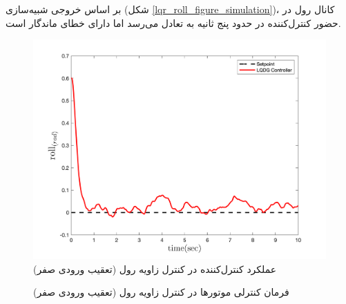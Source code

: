 بر اساس خروجی شبیه‌سازی (شکل
\ref{lqr_roll_figure_simulation})،
کانال رول در حضور کنترل‌کننده  در حدود پنج ثانیه به تعادل می‌رسد اما دارای خطای ماندگار است. 



\begin{figure}[H]
	\includegraphics[width=.48\linewidth]{../Figures/MIL/LQDG/Roll/lqdg_roll.png}
	\centering
	\caption{عملكرد کنترل‌کننده  در کنترل زاويه رول (تعقیب ورودی صفر)}
	\label{lqdg_roll_fig_simulation_n}
\end{figure}
\begin{figure}[H]
	\centering
	\caption{‫‪فرمان کنترلی موتورها در کنترل زاویه رول (تعقیب ورودی صفر)}
\end{figure}





